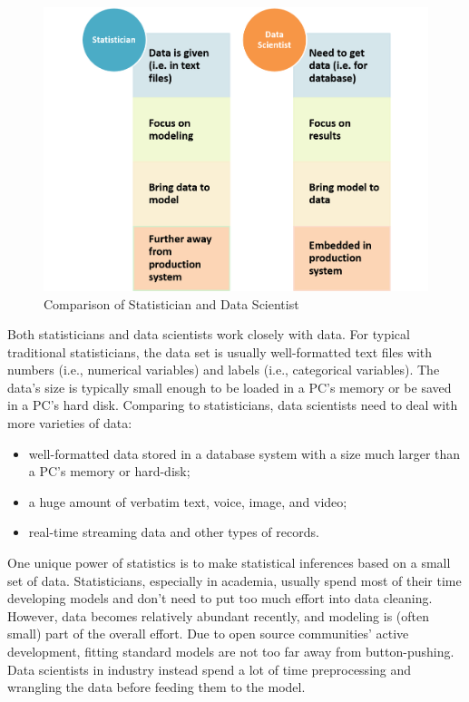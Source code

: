 \documentclass[12pt,]{krantz}
\providecommand{\tightlist}{%
  \setlength{\itemsep}{0pt}\setlength{\parskip}{0pt}}
\begin{document}
\begin{figure}

{\centering \includegraphics[width=0.8\linewidth]{images/softskill1} 

}

\caption{Comparison of Statistician and Data Scientist}\label{fig:softskill1}
\end{figure}

Both statisticians and data scientists work closely with data. For typical traditional statisticians, the data set is usually well-formatted text files with numbers (i.e., numerical variables) and labels (i.e., categorical variables). The data's size is typically small enough to be loaded in a PC's memory or be saved in a PC's hard disk. Comparing to statisticians, data scientists need to deal with more varieties of data:

\begin{itemize}
\tightlist
\item
  well-formatted data stored in a database system with a size much larger than a PC's memory or hard-disk;
\item
  a huge amount of verbatim text, voice, image, and video;
\item
  real-time streaming data and other types of records.
\end{itemize}

One unique power of statistics is to make statistical inferences based on a small set of data. Statisticians, especially in academia, usually spend most of their time developing models and don't need to put too much effort into data cleaning. However, data becomes relatively abundant recently, and modeling is (often small) part of the overall effort. Due to open source communities' active development, fitting standard models are not too far away from button-pushing. Data scientists in industry instead spend a lot of time preprocessing and wrangling the data before feeding them to the model.
\end{document}
